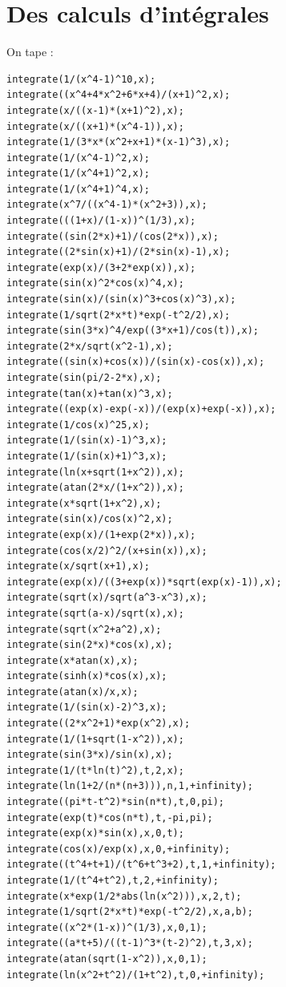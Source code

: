 \documentclass[a4paper,11pt]{book}
\begin{document}
\section{Des calculs d'int\'egrales}
On tape :
\begin{verbatim}
integrate(1/(x^4-1)^10,x);
integrate((x^4+4*x^2+6*x+4)/(x+1)^2,x);
integrate(x/((x-1)*(x+1)^2),x);
integrate(x/((x+1)*(x^4-1)),x);
integrate(1/(3*x*(x^2+x+1)*(x-1)^3),x);
integrate(1/(x^4-1)^2,x);
integrate(1/(x^4+1)^2,x);
integrate(1/(x^4+1)^4,x);
integrate(x^7/((x^4-1)*(x^2+3)),x);
integrate(((1+x)/(1-x))^(1/3),x);
integrate((sin(2*x)+1)/(cos(2*x)),x);
integrate((2*sin(x)+1)/(2*sin(x)-1),x);
integrate(exp(x)/(3+2*exp(x)),x);
integrate(sin(x)^2*cos(x)^4,x);
integrate(sin(x)/(sin(x)^3+cos(x)^3),x);
integrate(1/sqrt(2*x*t)*exp(-t^2/2),x);
integrate(sin(3*x)^4/exp((3*x+1)/cos(t)),x);
integrate(2*x/sqrt(x^2-1),x);
integrate((sin(x)+cos(x))/(sin(x)-cos(x)),x);
integrate(sin(pi/2-2*x),x);
integrate(tan(x)+tan(x)^3,x);
integrate((exp(x)-exp(-x))/(exp(x)+exp(-x)),x);
integrate(1/cos(x)^25,x);
integrate(1/(sin(x)-1)^3,x);
integrate(1/(sin(x)+1)^3,x);
integrate(ln(x+sqrt(1+x^2)),x);
integrate(atan(2*x/(1+x^2)),x);
integrate(x*sqrt(1+x^2),x);
integrate(sin(x)/cos(x)^2,x);
integrate(exp(x)/(1+exp(2*x)),x);
integrate(cos(x/2)^2/(x+sin(x)),x);
integrate(x/sqrt(x+1),x);
integrate(exp(x)/((3+exp(x))*sqrt(exp(x)-1)),x);
integrate(sqrt(x)/sqrt(a^3-x^3),x);
integrate(sqrt(a-x)/sqrt(x),x);
integrate(sqrt(x^2+a^2),x);
integrate(sin(2*x)*cos(x),x);
integrate(x*atan(x),x);
integrate(sinh(x)*cos(x),x);
integrate(atan(x)/x,x);
integrate(1/(sin(x)-2)^3,x);
integrate((2*x^2+1)*exp(x^2),x);
integrate(1/(1+sqrt(1-x^2)),x);
integrate(sin(3*x)/sin(x),x);
integrate(1/(t*ln(t)^2),t,2,x);
integrate(ln(1+2/(n*(n+3))),n,1,+infinity);
integrate((pi*t-t^2)*sin(n*t),t,0,pi);
integrate(exp(t)*cos(n*t),t,-pi,pi);
integrate(exp(x)*sin(x),x,0,t);
integrate(cos(x)/exp(x),x,0,+infinity);
integrate((t^4+t+1)/(t^6+t^3+2),t,1,+infinity);
integrate(1/(t^4+t^2),t,2,+infinity);
integrate(x*exp(1/2*abs(ln(x^2))),x,2,t);
integrate(1/sqrt(2*x*t)*exp(-t^2/2),x,a,b);
integrate((x^2*(1-x))^(1/3),x,0,1);
integrate((a*t+5)/((t-1)^3*(t-2)^2),t,3,x);
integrate(atan(sqrt(1-x^2)),x,0,1);
integrate(ln(x^2+t^2)/(1+t^2),t,0,+infinity);
\end{verbatim}
\end{document}
